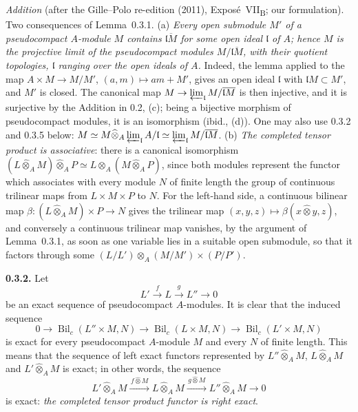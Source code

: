 \medskip\noindent
\emph{Addition} (after the Gille--Polo re-edition (2011), Expos\'e~VII\textsubscript{B}; our formulation).
Two consequences of Lemma~0.3.1. (a) \emph{Every open submodule \(M'\) of a pseudocompact \(A\)-module
\(M\) contains \(\overline{\mathfrak lM}\) for some open ideal \(\mathfrak l\) of \(A\); hence \(M\) is
the projective limit of the pseudocompact modules \(M/\overline{\mathfrak lM}\), with their quotient
topologies, \(\mathfrak l\) ranging over the open ideals of \(A\).} Indeed, the lemma applied to the
map \(A\times M\to M/M'\), \((a,m)\mapsto am+M'\), gives an open ideal \(\mathfrak l\) with
\(\mathfrak lM\subset M'\), and \(M'\) is closed. The canonical map
\(M\to\varprojlim_{\mathfrak l}M/\overline{\mathfrak lM}\) is then injective, and it is surjective by
the Addition in 0.2, (c); being a bijective morphism of pseudocompact modules, it is an isomorphism
(ibid., (d)). One may also use 0.3.2 and 0.3.5 below:
\(M\simeq M\widehat\otimes_A\varprojlim_{\mathfrak l}A/\mathfrak l
\simeq\varprojlim_{\mathfrak l}M/\overline{\mathfrak lM}\).
(b) \emph{The completed tensor product is associative}: there is a canonical isomorphism
\((L\widehat\otimes_AM)\widehat\otimes_AP\simeq L\widehat\otimes_A(M\widehat\otimes_AP)\), since both
modules represent the functor which associates with every module \(N\) of finite length the group of
continuous trilinear maps from \(L\times M\times P\) to \(N\). For the left-hand side, a continuous
bilinear map \(\beta\colon(L\widehat\otimes_AM)\times P\to N\) gives the trilinear map
\((x,y,z)\mapsto\beta(x\widehat\otimes y,z)\), and conversely a continuous trilinear map vanishes, by
the argument of Lemma~0.3.1, as soon as one variable lies in a suitable open submodule, so that it
factors through some \((L/L')\otimes_A(M/M')\times(P/P')\).

\medskip
\noindent\textbf{0.3.2.}
\label{sga3:VIIB:0.3.2}
Let
\[
  L'\xrightarrow{\,f\,}L\xrightarrow{\,g\,}L''\longrightarrow0
\]
be an exact sequence of pseudocompact \(A\)-modules. It is clear that
the induced sequence
\[
  0\longrightarrow
  \operatorname{Bil}_{c}(L''\times M,N)
  \longrightarrow
  \operatorname{Bil}_{c}(L\times M,N)
  \longrightarrow
  \operatorname{Bil}_{c}(L'\times M,N)
\]
is exact for every pseudocompact \(A\)-module \(M\) and every \(N\) of
finite length. This means that the sequence of left exact functors
represented by \(L''\widehat{\otimes}_{A}M\), \(L\widehat{\otimes}_{A}M\)
and \(L'\widehat{\otimes}_{A}M\) is exact; in other words, the sequence
\begin{equation}
  L'\widehat{\otimes}_{A}M
  \xrightarrow{\,f\widehat{\otimes}M\,}
  L\widehat{\otimes}_{A}M
  \xrightarrow{\,g\widehat{\otimes}M\,}
  L''\widehat{\otimes}_{A}M
  \longrightarrow0
  \tag{\(*\)}
  \label{sga3:VIIB:0.3.2.star}
\end{equation}
is exact: \emph{the completed tensor product functor is right exact}.

